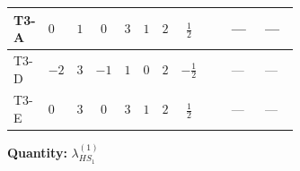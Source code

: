 \documentclass[8pt]{article}
\begin{document}
\begin{landscape}
\begin{longtable}{@{}llcccccc >{\raggedright\arraybackslash}p{0.21\linewidth} >{\raggedright\arraybackslash}p{0.21\linewidth} >{\raggedright\arraybackslash}p{0.21\linewidth}@{}}
\midrule
T3-A & $0$ & $1$ & $0$ & $3$ & $1$ & $2$ & $\frac{1}{2}$ & \scriptsize\adjustbox{max width=\linewidth}{$\begin{gathered} +12 {\lambda_5} \left({\lambda_5}\right)^{*}\end{gathered}$} & --- & --- \\
\midrule
T3-D & $-2$ & $3$ & $-1$ & $1$ & $0$ & $2$ & $-\frac{1}{2}$ & \scriptsize\adjustbox{max width=\linewidth}{$\begin{gathered} +4 {\lambda_5} \left({\lambda_5}\right)^{*}\end{gathered}$} & --- & --- \\
\midrule
T3-E & $0$ & $3$ & $0$ & $3$ & $1$ & $2$ & $\frac{1}{2}$ & \scriptsize\adjustbox{max width=\linewidth}{$\begin{gathered} +4 {\lambda_5} \left({\lambda_5}\right)^{*}\end{gathered}$} & --- & --- \\
\midrule
\bottomrule
\end{longtable}
\clearpage
\noindent\textbf{Quantity: }$\lambda_{HS_1}^{(1)}$\par\smallskip

\end{landscape}
\end{document}
